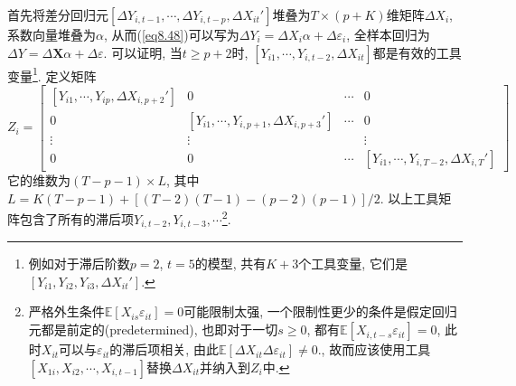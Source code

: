 \documentclass[cn, 12pt, math=mtpro2, bibstyle=apa, blue, twocol]{elegantbook}
\newcommand{\E}{\mathbb{E}}
\newcommand{\X}{\mathbold{X}}
\begin{document}
首先将差分回归元$[\Delta Y_{i,t-1},\cdots,\Delta Y_{i,t-p},\Delta X_{it}']$堆叠为$T\times (p+K)$维矩阵$\Delta X_i$, 系数向量堆叠为$\alpha$, 从而(\ref{eq8.48})可以写为$\Delta Y_i=\Delta X_i\alpha+\Delta\varepsilon_i$, 全样本回归为$\Delta Y=\Delta \X\alpha+\Delta\varepsilon$. 可以证明, 当$t\geq p+2$时, $[Y_{i1},\cdots,Y_{i,t-2},\Delta X_{it}]$都是有效的工具变量\footnote{例如对于滞后阶数$p=2$, $t=5$的模型, 共有$K+3$个工具变量, 它们是$[Y_{i1},Y_{i2},Y_{i3},\Delta X_{it}']$.}.  定义矩阵
\begin{equation*}
  Z_i=\begin{bmatrix}
        [Y_{i1},\cdots,Y_{ip},\Delta X_{i,p+2}'] & 0 & \cdots & 0 \\
        0 & [Y_{i1},\cdots,Y_{i,p+1},\Delta X_{i,p+3}'] & \cdots & 0 \\
        \vdots & \vdots &  & \vdots \\
        0 & 0 & \cdots & [Y_{i1},\cdots,Y_{i,T-2},\Delta X_{i,T}']
      \end{bmatrix}
\end{equation*}
它的维数为$(T-p-1)\times L$, 其中$L=K(T-p-1)+[(T-2)(T-1)-(p-2)(p-1)]/2$. 以上工具矩阵包含了所有的滞后项$Y_{i,t-2}, Y_{i,t-3},\cdots$\footnote{严格外生条件$\E[X_{is}\varepsilon_{it}]=0$可能限制太强, 一个限制性更少的条件是假定回归元都是前定的(predetermined), 也即对于一切$s\geq0$, 都有$\E[X_{i,t-s}\varepsilon_{it}]=0$, 此时$X_{it}$可以与$\varepsilon_{it}$的滞后项相关, 由此$\E[\Delta X_{it}\Delta \varepsilon_{it}]\neq0.$, 故而应该使用工具$[X_{1i},X_{i2},\cdots,X_{i,t-1}]$替换$\Delta X_{it}$并纳入到$Z_i$中.}.
\end{document}
